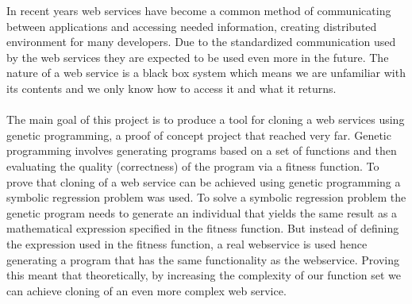 In recent years web services have become a common method of communicating between applications
and accessing needed information, creating distributed environment for many developers.
Due to the standardized communication used by the web services they are expected to be used even 
more in the future. The nature of a web service is a black box system which means we are unfamiliar with its contents and we only know how to
access it and what it returns. 
\paragraph{}
The main goal of this project is to produce a tool for cloning a web services using genetic
programming, a proof of concept project that reached very far. Genetic programming 
involves generating programs based on a set of functions and then evaluating the quality (correctness)
of the program via a fitness function. To prove that cloning of a web service can be achieved using
genetic programming  a symbolic regression problem was used. To solve a symbolic regression problem the genetic program needs to 
generate an individual that yields the same result as a mathematical expression specified in the fitness function. But 
instead of defining the expression used in the fitness function, a real webservice is used hence generating a program
that has the same functionality as the webservice. Proving this meant that theoretically, by increasing 
the complexity of our function set we can achieve cloning of an even more complex web service.
